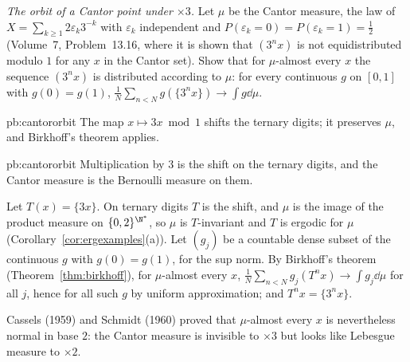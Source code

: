 \begin{exercise}[$\star\star$]\label{pb:cantororbit}
\emph{The orbit of a Cantor point under $\times3$.} Let $\mu$ be the Cantor measure, the law of $X=\sum_{k\ge1}2\varepsilon_k3^{-k}$ with $\varepsilon_k$ independent and
$P(\varepsilon_k=0)=P(\varepsilon_k=1)=\frac12$ (Volume~7, Problem~13.16, where it is shown that $(3^nx)$ is not equidistributed modulo $1$ for any $x$ in the Cantor set).
Show that for $\mu$-almost every $x$ the sequence $(3^nx)$ is distributed according to $\mu$: for every
continuous $g$ on $[0,1]$ with $g(0)=g(1)$, $\frac1N\sum_{n<N}g(\{3^nx\})\to\int g\dd\mu$.
\end{exercise}

\begin{hint}{pb:cantororbit}
The map $x\mapsto3x\bmod1$ shifts the ternary digits; it preserves $\mu$, and Birkhoff's theorem applies.
\end{hint}

\begin{solution}{pb:cantororbit}
\idea Multiplication by $3$ is the shift on the ternary digits, and the Cantor measure is the Bernoulli measure on them.

\writeup Let $T(x)=\{3x\}$. On ternary digits $T$ is the shift, and $\mu$ is the image of the product measure on $\{0,2\}^{\N^*}$, so $\mu$ is $T$-invariant and $T$ is
ergodic for $\mu$ (Corollary~\ref{cor:ergexamples}(a)). Let $(g_j)$ be a countable dense subset of the continuous $g$ with $g(0)=g(1)$, for the sup norm. By Birkhoff's theorem
(Theorem~\ref{thm:birkhoff}), for $\mu$-almost every $x$, $\frac1N\sum_{n<N}g_j(T^nx)\to\int g_j\dd\mu$ for all $j$, hence for all such $g$ by uniform approximation; and $T^nx=\{3^nx\}$.

\leads Cassels (1959) and Schmidt (1960) proved that $\mu$-almost every $x$ is nevertheless normal in base $2$: the Cantor measure is invisible to $\times3$ but
looks like Lebesgue measure to $\times2$.
\end{solution}
